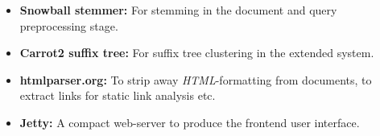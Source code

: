 \begin{itemize}
	\item \textbf{Snowball stemmer:} For stemming in the document and query preprocessing stage.
	\item \textbf{Carrot2 suffix tree:} For suffix tree clustering in the extended system. 
	\item \textbf{htmlparser.org:} To strip away \emph{HTML}-formatting from documents, to extract links for static link analysis etc.
	\item \textbf{Jetty:} A compact web-server to produce the frontend user interface. 	 
\end{itemize}
